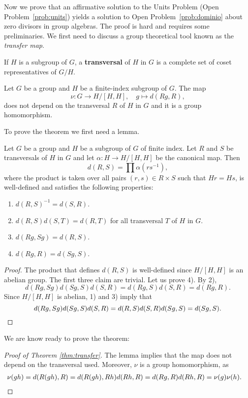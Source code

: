 
Now we prove that an affirmative solution 
to the Units Problem 
(Open Problem~\ref{prob:units}) 
yields a solution to 
Open Problem~\ref{prob:dominio} about zero divisors in group algebras.
The proof is hard and requires some preliminaries. We first need
to discuss a group theoretical tool known as the \emph{transfer map}. 

If $H$ is a subgroup of $G$, a \textbf{transversal} of $H$ in $G$ is a complete
set of coset representatives of $G/H$. 

\begin{theorem}
	\label{thm:transfer}
	Let $G$ be a group and $H$ be a finite-index subgroup of $G$. The map 	
	\[
		\nu\colon G\to H/[H,H],\quad
		g\mapsto d(Rg,R),
	\]
	does not depend on the transversal $R$ of $H$ in $G$ and it is a group
	homomorphism. 
\end{theorem}

To prove the theorem we first need a lemma. 

\begin{lemma}
	\label{lem:d}
	Let $G$ be a group and $H$ be a subgroup of $G$ of finite index.  Let $R$
	and $S$ be transversals of $H$ in $G$ and let $\alpha\colon H\to H/[H,H]$
	be the canonical map. Then 
	\[
		d(R,S)=\prod \alpha(rs^{-1}),
	\]
	where the product is taken over all pairs 
	$(r,s)\in R\times S$ such that $Hr=Hs$,
	is well-defined and satisfies the following properties:
	\begin{enumerate}
		\item $d(R,S)^{-1}=d(S,R)$.
		\item $d(R,S)d(S,T)=d(R,T)$ for all transversal $T$ of $H$ in $G$.
		\item $d(Rg,Sg)=d(R,S)$.
		\item $d(Rg,R)=d(Sg,S)$.
	\end{enumerate}
\end{lemma}

\begin{proof}
	The product that defines $d(R,S)$ is well-defined since $H/[H,H]$ is 
	an abelian group. The first three claim are trivial. Let us prove
	4). By 2), 
	\[
		d(Rg,Sg)d(Sg,S)d(S,R)=d(Rg,S)d(S,R)=d(Rg,R).
	\]
	Since $H/[H,H]$ is abelian, 1) and 3) imply that 	
	\[
		d(Rg,Sg)d(Sg,S)d(S,R)=d(R,S)d(S,R)d(Sg,S)=d(Sg,S).\qedhere
	\]
\end{proof}

We are know ready to prove the theorem: 

\begin{proof}[Proof of Theorem \ref{thm:transfer}]
	The lemma implies that the map does not depend on the transversal used. 
	Moreover, $\nu$ is a group homomorphism, as 
	\begin{align*}
		\nu(gh)&=d(R(gh),R)
		=d(R(gh),Rh)d(Rh,R)
		=d(Rg,R)d(Rh,R)=\nu(g)\nu(h).\qedhere
	\end{align*}
\end{proof}

